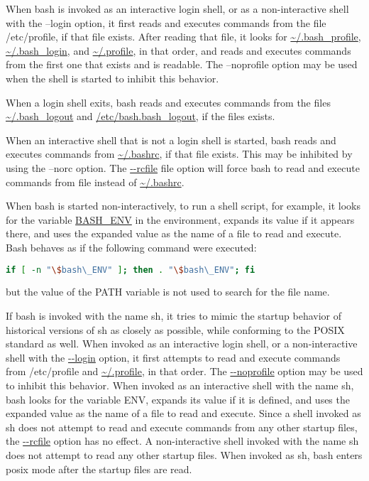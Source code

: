 \documentclass[11pt]{article}
\begin{document}
When bash is invoked as an interactive login shell, or as a non-interactive shell with the --login option, it first reads and executes commands from the file /etc/profile, if that file exists. After reading that file, it looks for \url{~/.bash_profile}, \url{~/.bash_login}, and \url{~/.profile}, in that order, and reads and executes commands from the first one that exists and is readable. The --noprofile option may be used when the shell is started to inhibit this behavior.

When a login shell exits, bash reads and executes commands from the files \url{~/.bash_logout} and \url{/etc/bash.bash_logout}, if the files exists.

When an interactive shell that is not a login shell is started, bash reads and executes commands from \url{~/.bashrc}, if that file exists. This may be inhibited by using the --norc option. The \url{--rcfile} file option will force bash to read and execute commands from file instead of \url{~/.bashrc}.

When bash is started non-interactively, to run a shell script, for example, it looks for the variable \url{BASH_ENV} in the environment, expands its value if it appears there, and uses the expanded value as the name of a file to read and execute. Bash behaves as if the following command were executed:

\begin{lstlisting}[language=bash]
    if [ -n "\$bash\_ENV" ]; then . "\$bash\_ENV"; fi
\end{lstlisting}
but the value of the PATH variable is not used to search for the file name.

If bash is invoked with the name sh, it tries to mimic the startup behavior of historical versions of sh as closely as possible, while conforming to the POSIX standard as well. When invoked as an interactive login shell, or a non-interactive shell with the \url{--login} option, it first attempts to read and execute commands from /etc/profile and \url{~/.profile}, in that order. The \url{--noprofile} option may be used to inhibit this behavior. When invoked as an interactive shell with the name sh, bash looks for the variable ENV, expands its value if it is defined, and uses the expanded value as the name of a file to read and execute. Since a shell invoked as sh does not attempt to read and execute commands from any other startup files, the \url{--rcfile} option has no effect. A non-interactive shell invoked with the name sh does not attempt to read any other startup files. When invoked as sh, bash enters posix mode after the startup files are read.
\end{document}
